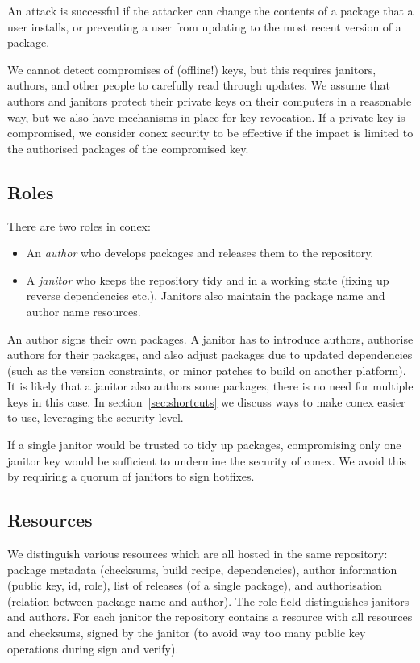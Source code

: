 \documentclass[nocopyrightspace]{sigplanconf}
\begin{document}
An attack is successful if the attacker can change the contents of a package that a user installs, or preventing a user from updating to the most recent version of a package.

We cannot detect compromises of (offline!) keys, but this requires janitors, authors, and other people to carefully read through updates.
We assume that authors and janitors protect their private keys on their computers in a reasonable way, but we also have mechanisms in place for key revocation.
If a private key is compromised, we consider conex security to be effective if the impact is limited to the authorised packages of the compromised key.

\subsection{Roles}
There are two roles in conex:
\begin{itemize}
  \item An \emph{author} who develops packages and releases them to the repository.
  \item A \emph{janitor} who keeps the repository tidy and in a working state (fixing up reverse dependencies etc.).  Janitors also maintain the package name and author name resources.
\end{itemize}

An author signs their own packages.
A janitor has to introduce authors, authorise authors for their packages, and also adjust packages due to updated dependencies (such as the version constraints, or minor patches to build on another platform).
It is likely that a janitor also authors some packages, there is no need for multiple keys in this case.
In section~\ref{sec:shortcuts} we discuss ways to make conex easier to use, leveraging the security level.

If a single janitor would be trusted to tidy up packages, compromising only one janitor key would be sufficient to undermine the security of conex.
We avoid this by requiring a quorum of janitors to sign hotfixes.

\subsection{Resources}
We distinguish various resources which are all hosted in the same repository:
package metadata (checksums, build recipe, dependencies), author information (public key, id, role), list of releases (of a single package), and authorisation (relation between package name and author).
The role field distinguishes janitors and authors.
For each janitor the repository contains a resource with all resources and checksums, signed by the janitor (to avoid way too many public key operations during sign and verify).
\end{document}
